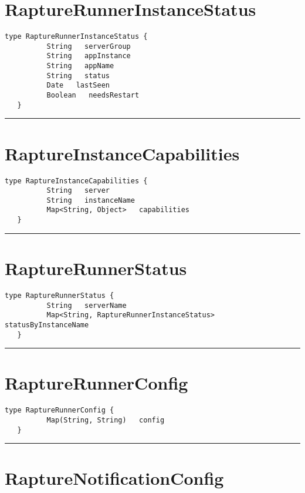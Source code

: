 \section{RaptureRunnerInstanceStatus}
\label{type:RaptureRunnerInstanceStatus}

\begin{lstlisting}[style=nonumbers]
   type RaptureRunnerInstanceStatus {
          String   serverGroup
          String   appInstance
          String   appName
          String   status
          Date   lastSeen
          Boolean   needsRestart
   }
\end{lstlisting}

\rule{12cm}{2pt}
\section{RaptureInstanceCapabilities}
\label{type:RaptureInstanceCapabilities}

\begin{lstlisting}[style=nonumbers]
   type RaptureInstanceCapabilities {
          String   server
          String   instanceName
          Map<String, Object>   capabilities
   }
\end{lstlisting}

\rule{12cm}{2pt}
\section{RaptureRunnerStatus}
\label{type:RaptureRunnerStatus}

\begin{lstlisting}[style=nonumbers]
   type RaptureRunnerStatus {
          String   serverName
          Map<String, RaptureRunnerInstanceStatus>   statusByInstanceName
   }
\end{lstlisting}

\rule{12cm}{2pt}
\section{RaptureRunnerConfig}
\label{type:RaptureRunnerConfig}

\begin{lstlisting}[style=nonumbers]
   type RaptureRunnerConfig {
          Map(String, String)   config
   }
\end{lstlisting}

\rule{12cm}{2pt}
\section{RaptureNotificationConfig}
\label{type:RaptureNotificationConfig}

